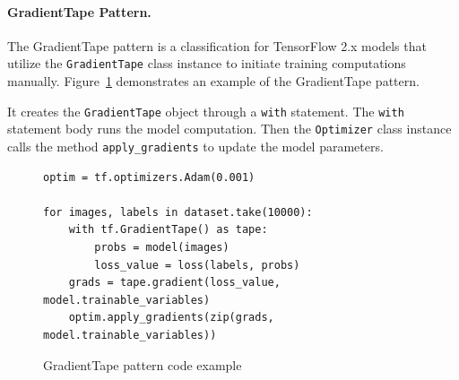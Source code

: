 \paragraph{GradientTape Pattern.}
The GradientTape pattern is a classification for TensorFlow 2.x models that
utilize the {\tt GradientTape} class instance to initiate training computations
manually.
Figure~\ref{fig:tapepattern} demonstrates an example of the
GradientTape pattern. 
\begin{inred}
It creates the {\tt GradientTape} object through a {\tt with} statement.
The {\tt with} statement body runs the model computation.
Then the {\tt Optimizer} class instance calls the method {\tt apply\_gradients}
to update the model parameters.
\end{inred}


\begin{figure}[!t]
  \begin{lstlisting}[style=mpython]
optim = tf.optimizers.Adam(0.001)

for images, labels in dataset.take(10000):
    with tf.GradientTape() as tape:
        probs = model(images)
        loss_value = loss(labels, probs)
    grads = tape.gradient(loss_value, model.trainable_variables)
    optim.apply_gradients(zip(grads, model.trainable_variables))\end{lstlisting}
  \caption{GradientTape pattern code example}
  \label{fig:tapepattern}
\end{figure}


